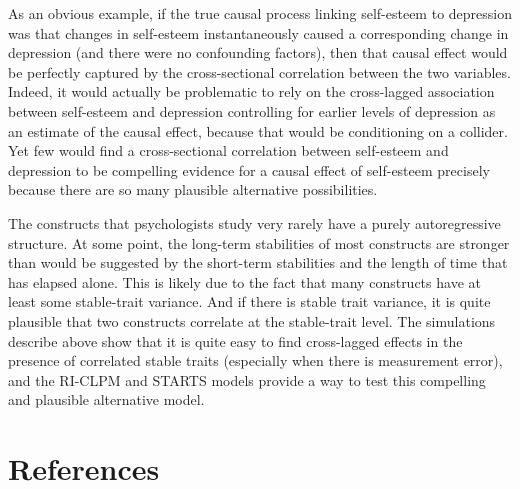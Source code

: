 \documentclass[
  english,
  man,floatsintext]{apa6}
\begin{document}
As an obvious example, if the true causal process linking self-esteem to depression was that changes in self-esteem instantaneously caused a corresponding change in depression (and there were no confounding factors), then that causal effect would be perfectly captured by the cross-sectional correlation between the two variables. Indeed, it would actually be problematic to rely on the cross-lagged association between self-esteem and depression controlling for earlier levels of depression as an estimate of the causal effect, because that would be conditioning on a collider. Yet few would find a cross-sectional correlation between self-esteem and depression to be compelling evidence for a causal effect of self-esteem precisely because there are so many plausible alternative possibilities.

The constructs that psychologists study very rarely have a purely autoregressive structure. At some point, the long-term stabilities of most constructs are stronger than would be suggested by the short-term stabilities and the length of time that has elapsed alone. This is likely due to the fact that many constructs have at least some stable-trait variance. And if there is stable trait variance, it is quite plausible that two constructs correlate at the stable-trait level. The simulations describe above show that it is quite easy to find cross-lagged effects in the presence of correlated stable traits (especially when there is measurement error), and the RI-CLPM and STARTS models provide a way to test this compelling and plausible alternative model.

\hypertarget{references}{%
\section*{References}\label{references}}
\end{document}
